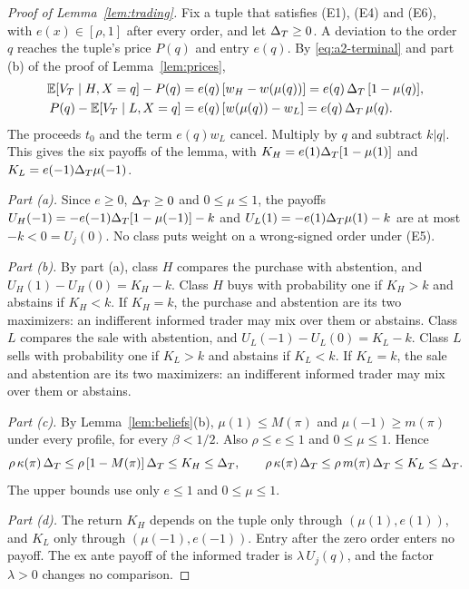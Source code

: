 \begin{proof}[Proof of Lemma~\ref{lem:trading}]
Fix a tuple that satisfies (E1), (E4) and (E6), with \(e(x)\in[\rho,1]\) after every order, and let \(\Delta_T\ge0\). A
deviation to the order \(q\) reaches the tuple's price \(P(q)\) and entry \(e(q)\). By \eqref{eq:a2-terminal} and
part (b) of the proof of Lemma~\ref{lem:prices},
\[
\begin{aligned}
\mathbb{E}[V_T\mid H,X=q]-P(q)&=e(q)\,[w_H-w(\mu(q))]=e(q)\,\Delta_T\,[1-\mu(q)],\\
P(q)-\mathbb{E}[V_T\mid L,X=q]&=e(q)\,[w(\mu(q))-w_L]=e(q)\,\Delta_T\,\mu(q).
\end{aligned}
\]
The proceeds \(t_0\) and the term \(e(q)w_L\) cancel. Multiply by \(q\) and subtract \(k|q|\). This gives the six
payoffs of the lemma, with \(K_H=e(1)\Delta_T[1-\mu(1)]\) and \(K_L=e(-1)\Delta_T\mu(-1)\).

\emph{Part (a).} Since \(e\ge0\), \(\Delta_T\ge0\) and \(0\le\mu\le1\), the payoffs \(U_H(-1)=-e(-1)\Delta_T[1-\mu(-1)]-k\)
and \(U_L(1)=-e(1)\Delta_T\mu(1)-k\) are at most \(-k<0=U_j(0)\). No class puts weight on a wrong-signed order under
(E5).

\emph{Part (b).} By part (a), class \(H\) compares the purchase with abstention, and
\(U_H(1)-U_H(0)=K_H-k\). Class \(H\) buys with probability one if \(K_H>k\) and abstains if \(K_H<k\). If \(K_H=k\),
the purchase and abstention are its two maximizers: an indifferent informed trader may mix over them or abstains. Class \(L\) compares the sale with abstention, and \(U_L(-1)-U_L(0)=K_L-k\). Class \(L\) sells with
probability one if \(K_L>k\) and abstains if \(K_L<k\). If \(K_L=k\), the sale and abstention are its two maximizers:
an indifferent informed trader may mix over them or abstains.

\emph{Part (c).} By Lemma~\ref{lem:beliefs}(b), \(\mu(1)\le M(\pi)\) and \(\mu(-1)\ge m(\pi)\) under every profile,
for every \(\beta<1/2\). Also \(\rho\le e\le1\) and \(0\le\mu\le1\). Hence
\begin{equation}\label{eq:a2-bounds}
\rho\,\kappa(\pi)\,\Delta_T\le\rho\,[1-M(\pi)]\,\Delta_T\le K_H\le\Delta_T,\qquad
\rho\,\kappa(\pi)\,\Delta_T\le\rho\,m(\pi)\,\Delta_T\le K_L\le\Delta_T .
\end{equation}
The upper bounds use only \(e\le1\) and \(0\le\mu\le1\).

\emph{Part (d).} The return \(K_H\) depends on the tuple only through \((\mu(1),e(1))\), and \(K_L\) only through
\((\mu(-1),e(-1))\). Entry after the zero order enters no payoff. The ex ante payoff of the informed trader is
\(\lambda\,U_j(q)\), and the factor \(\lambda>0\) changes no comparison.
\end{proof}


